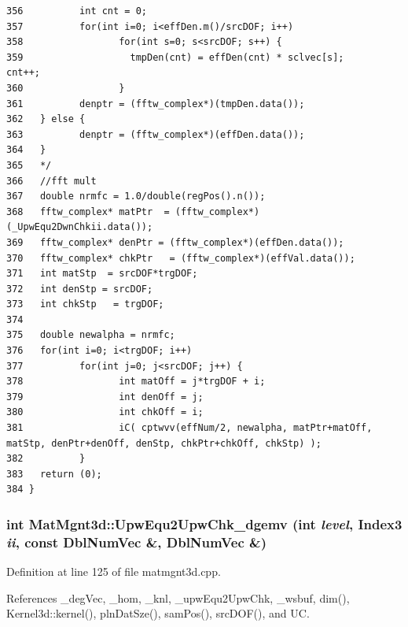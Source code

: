 \begin{verbatim}
356          int cnt = 0;
357          for(int i=0; i<effDen.m()/srcDOF; i++)
358                 for(int s=0; s<srcDOF; s++) {
359                   tmpDen(cnt) = effDen(cnt) * sclvec[s];                cnt++;
360                 }
361          denptr = (fftw_complex*)(tmpDen.data());
362   } else {
363          denptr = (fftw_complex*)(effDen.data());
364   }
365   */
366   //fft mult
367   double nrmfc = 1.0/double(regPos().n());
368   fftw_complex* matPtr  = (fftw_complex*)(_UpwEqu2DwnChkii.data());
369   fftw_complex* denPtr = (fftw_complex*)(effDen.data());
370   fftw_complex* chkPtr   = (fftw_complex*)(effVal.data());
371   int matStp  = srcDOF*trgDOF;
372   int denStp = srcDOF;
373   int chkStp   = trgDOF;
374   
375   double newalpha = nrmfc;
376   for(int i=0; i<trgDOF; i++)
377          for(int j=0; j<srcDOF; j++) {
378                 int matOff = j*trgDOF + i;
379                 int denOff = j;
380                 int chkOff = i;
381                 iC( cptwvv(effNum/2, newalpha, matPtr+matOff, matStp, denPtr+denOff, denStp, chkPtr+chkOff, chkStp) );
382          }
383   return (0);
384 }
\end{verbatim}\normalsize 


\subsubsection{\setlength{\rightskip}{0pt plus 5cm}int Mat\-Mgnt3d::Upw\-Equ2Upw\-Chk\_\-dgemv (int {\em level}, Index3 {\em ii}, const Dbl\-Num\-Vec \&, Dbl\-Num\-Vec \&)}\label{classMatMgnt3d_c90ec518abbf6f391ef382697c60da9c_c90ec518abbf6f391ef382697c60da9c}




Definition at line 125 of file matmgnt3d.cpp.

References \_\-deg\-Vec, \_\-hom, \_\-knl, \_\-upw\-Equ2Upw\-Chk, \_\-wsbuf, dim(), Kernel3d::kernel(), pln\-Dat\-Sze(), sam\-Pos(), src\-DOF(), and UC.

